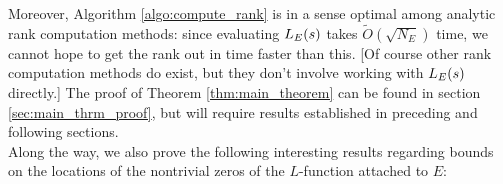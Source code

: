 Moreover, Algorithm \ref{algo:compute_rank} is in a sense optimal among analytic rank computation methods: since evaluating $L_E(s)$ takes $\tilde{O}(\sqrt{N_E})$ time, we cannot hope to get the rank out in time faster than this. [Of course other rank computation methods do exist, but they don't involve working with $L_E(s)$ directly.] The proof of Theorem \ref{thm:main_theorem} can be found in section \ref{sec:main_thrm_proof}, but will require results established in preceding and following sections. \\

Along the way, we also prove the following interesting results regarding bounds on the locations of the nontrivial zeros of the $L$-function attached to $E$:

